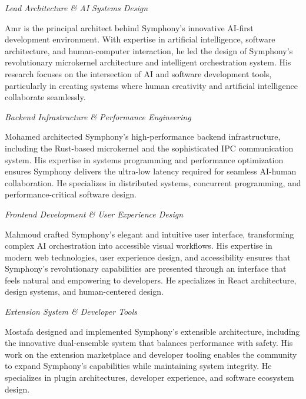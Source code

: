 \begin{description}[leftmargin=4cm,labelwidth=3.5cm,itemsep=1.5cm]

\item[\textbf{\textcolor{brandPrimary}{AMR MUHMAED FATHY}}] 
\textit{Lead Architecture \& AI Systems Design}

Amr is the principal architect behind Symphony's innovative AI-first development environment. With expertise in artificial intelligence, software architecture, and human-computer interaction, he led the design of Symphony's revolutionary microkernel architecture and intelligent orchestration system. His research focuses on the intersection of AI and software development tools, particularly in creating systems where human creativity and artificial intelligence collaborate seamlessly.

\item[\textbf{\textcolor{brandSecondary}{MOHAMED}}] 
\textit{Backend Infrastructure \& Performance Engineering}

Mohamed architected Symphony's high-performance backend infrastructure, including the Rust-based microkernel and the sophisticated IPC communication system. His expertise in systems programming and performance optimization ensures Symphony delivers the ultra-low latency required for seamless AI-human collaboration. He specializes in distributed systems, concurrent programming, and performance-critical software design.

\item[\textbf{\textcolor{brandAccent}{MAHMOUD}}] 
\textit{Frontend Development \& User Experience Design}

Mahmoud crafted Symphony's elegant and intuitive user interface, transforming complex AI orchestration into accessible visual workflows. His expertise in modern web technologies, user experience design, and accessibility ensures that Symphony's revolutionary capabilities are presented through an interface that feels natural and empowering to developers. He specializes in React architecture, design systems, and human-centered design.

\item[\textbf{\textcolor{brandTertiary}{MOSTAFA}}] 
\textit{Extension System \& Developer Tools}

Mostafa designed and implemented Symphony's extensible architecture, including the innovative dual-ensemble system that balances performance with safety. His work on the extension marketplace and developer tooling enables the community to expand Symphony's capabilities while maintaining system integrity. He specializes in plugin architectures, developer experience, and software ecosystem design.


\end{description}
